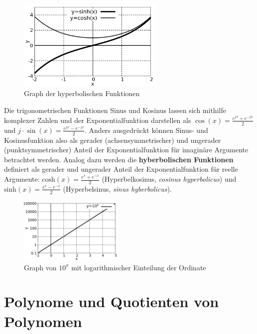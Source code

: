 \begin{minipage}[t]{1\textwidth}
    \begin{figure}
        \centering
        \includegraphics[width=7cm]{./gnuplot/base-function-hyp}
        \caption{Graph der hyperbolischen Funktionen}
        \label{fig:ExBaseFunHyperbolic}
    \end{figure}
    Die trigonometrischen Funktionen Sinus und Kosinus lassen sich mithilfe komplexer Zahlen und der Exponentialfunktion darstellen als $\cos(x) = \frac{e^{jx}+e^{-jx}}{2}$ und $j\cdot \sin(x) = \frac{e^{jx}-e^{-jx}}{2}$. Anders ausgedrückt können Sinus- und Kosinusfunktion also als gerader (achsensymmetrischer) und ungerader (punktsymmetrischer) Anteil der Exponentialfunktion für imaginäre Argumente betrachtet werden. Analog dazu werden die \textbf{hyberbolischen Funktionen} definiert als gerader und ungerader Anteil der Exponentialfunktion für reelle Argumente: $\text{cosh}(x) = \frac{e^x+e^{-x}}{2}$ (Hyperbelkosinus, \emph{cosinus hyperbolicus}) und $\text{sinh}(x) = \frac{e^x-e^{-x}}{2}$ (Hyperbelsinus, \emph{sinus hyberbolicus}).
\end{minipage}


\begin{figure}
    \centering
    \includegraphics[width=0.45\textwidth]{./gnuplot/log-scale-plot}
    \caption{Graph von $10^x$ mit logarithmischer Einteilung der Ordinate}
    \label{fig:LogScalePlot}
\end{figure}

\clearpage

\section{Polynome und Quotienten von Polynomen}


